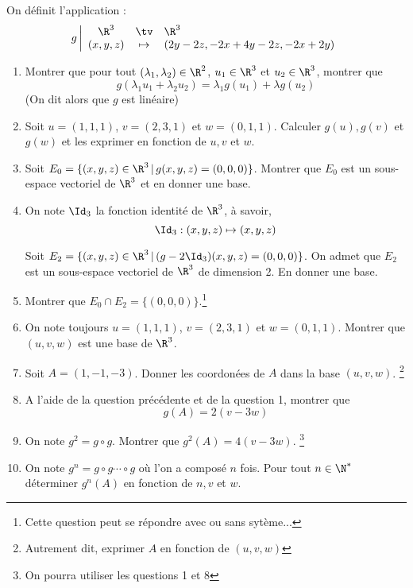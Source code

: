 \documentclass[a4paper, 11pt,reqno]{article}
\begin{document}
\vspace{0.5cm}
\begin{exercice}


On définit l'application : 
$$g \left| \begin{array}{ccl}
\R^3 &\tv& \R^3 \\
(x,y,z) &\mapsto & (2y-2z, -2x+4y-2z, -2x+2y)
\end{array}\right.$$
\begin{enumerate}
\item Montrer que pour tout  $(\lambda_1,\lambda_2) \in \R^2$,  $u_1\in \R^3$ et $u_2\in \R^3$,  montrer que 
$$g(\lambda_1 u_1+\lambda_2 u_2) =\lambda_1 g(u_1)+\lambda g(u_2)$$
(On dit alors que $g$ est linéaire) 
\item Soit $u=(1,1,1)$, $v=(2,3,1)$ et $w=(0,1,1)$. Calculer $g(u), g(v)$ et $g(w)$ et les exprimer en fonction de $u, v$ et $w$.

\item Soit $E_0 = \{ (x,y,z)\in \R^3\, |\, g(x,y,z)=(0,0,0)\}$. 
Montrer que $E_0$ est un sous-espace vectoriel de $\R^3$ et en donner une base. 
\item  On note $\Id_3$ la fonction identité de $\R^3$, à savoir, 
$$\Id_3 : (x,y,z)\mapsto (x,y,z)$$

Soit  $E_2 = \{ (x,y,z)\in \R^3\, |\, (g-2\Id_3)(x,y,z)=(0,0,0)\}$. 
On admet que  $E_2$ est un sous-espace vectoriel de $\R^3$ de dimension 2. En donner une base. 
\item Montrer que $E_0\cap E_2= \{ (0,0,0)\}$.\footnote{Cette question peut se répondre avec ou sans sytème...}
\item On note toujours $u=(1,1,1)$, $v=(2,3,1)$ et $w=(0,1,1)$. Montrer que $(u,v,w)$ est une base de $\R^3$. 
\item Soit $A=(1,-1,-3)$. Donner les coordonées de  $A$ dans la base $(u,v,w)$. \footnote{Autrement dit,  exprimer $A$ en fonction de $(u,v,w)$}
\item A l'aide de la question précédente et de la question 1, montrer que 
$$g(A)= 2(v-3w)$$
\item On note $g^2=g\circ g$. Montrer que  $g^2(A) = 4(v-3w)$.  \footnote{On pourra utiliser les questions 1 et 8}
\item On note $g^n = g\circ g\cdots \circ g $ où l'on a composé $n$ fois. Pour tout $n\in \N^*$ déterminer $g^n(A) $ en fonction de $n, v$ et $ w$.
\end{enumerate}
\end{exercice}
\end{document}

